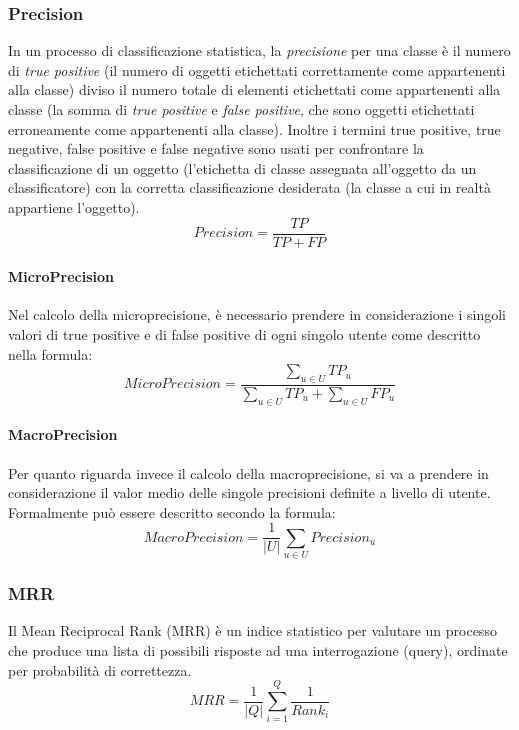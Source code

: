 \subsubsection{Precision}
\label{precision}
In un processo di classificazione statistica, la \emph{precisione} per una classe è il numero di \emph{true positive} (il numero di oggetti etichettati correttamente come appartenenti alla classe) diviso il numero totale di elementi etichettati come appartenenti alla classe (la somma di \emph{true positive} e \emph{false positive}, che sono oggetti etichettati erroneamente come appartenenti alla classe).
Inoltre i termini true positive, true negative, false positive e false negative sono usati per confrontare la classificazione di un oggetto (l’etichetta di classe assegnata all’oggetto da un classificatore) con la corretta classificazione desiderata (la classe a cui in realtà appartiene l’oggetto).
\begin{equation*}
Precision =\frac{TP}{TP+FP}
\end{equation*}

\paragraph{MicroPrecision}
Nel calcolo della microprecisione, è necessario prendere in considerazione i singoli valori di true positive e di false positive di ogni singolo utente come descritto nella formula:
\begin{equation*}
MicroPrecision =\frac{\sum\limits_{u\in U}^{}TP_u}{\sum\limits_{u\in U}^{}TP_u+\sum\limits_{u\in U}^{}FP_u}
\end{equation*}

\paragraph{MacroPrecision}
Per quanto riguarda invece il calcolo della macroprecisione, si va a prendere in considerazione il valor medio delle singole precisioni definite a livello di utente. Formalmente può essere descritto secondo la formula:
\begin{equation*}
MacroPrecision =\frac{1}{|U|}\sum\limits_{u\in U}{Precision_u}
\end{equation*}

\subsubsection{MRR}
\label{MRR}
Il Mean Reciprocal Rank (MRR) è un indice statistico per valutare un processo che produce una lista di possibili risposte ad una interrogazione (query), ordinate per probabilità di correttezza.
\begin{equation*}
MRR = \frac{1}{|Q|}\sum_{i=1}^{Q}{\frac{1}{Rank_i}}
\end{equation*}

